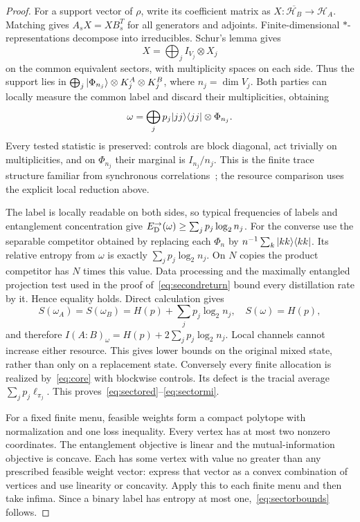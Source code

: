 \begin{proof}
For a support vector of $\rho$, write its coefficient matrix as $X:\overline{\mathcal H_B}\to\mathcal H_A$. Matching gives $A_sX=XB_s^T$ for all generators and adjoints. Finite-dimensional $*$-representations decompose into irreducibles. Schur's lemma gives
\[
 X=\bigoplus_j I_{V_j}\otimes X_j
\]
on the common equivalent sectors, with multiplicity spaces on each side. Thus the support lies in $\bigoplus_j|\Phi_{n_j}\rangle\otimes K_j^A\otimes K_j^B$, where $n_j=\dim V_j$. Both parties can locally measure the common label and discard their multiplicities, obtaining
\begin{equation}
 \omega=\bigoplus_jp_j|jj\rangle\langle jj|\otimes\Phi_{n_j}.\label{eq:core}
\end{equation}
Every tested statistic is preserved: controls are block diagonal, act trivially on multiplicities, and on $\Phi_{n_j}$ their marginal is $I_{n_j}/n_j$. This is the finite trace structure familiar from synchronous correlations~\cite{psstw}; the resource comparison uses the explicit local reduction above.

The label is locally readable on both sides, so typical frequencies of labels and entanglement concentration give $E_{\mathrm D}^{\to}(\omega)\ge\sum_jp_j\log_2n_j$. For the converse use the separable competitor obtained by replacing each $\Phi_n$ by $n^{-1}\sum_k|kk\rangle\langle kk|$. Its relative entropy from $\omega$ is exactly $\sum_jp_j\log_2n_j$. On $N$ copies the product competitor has $N$ times this value. Data processing and the maximally entangled projection test used in the proof of~\eqref{eq:secondreturn} bound every distillation rate by it. Hence equality holds. Direct calculation gives
\[
 S(\omega_A)=S(\omega_B)=H(p)+\sum_jp_j\log_2n_j,\quad S(\omega)=H(p),
\]
and therefore $I(A:B)_\omega=H(p)+2\sum_jp_j\log_2n_j$. Local channels cannot increase either resource. This gives lower bounds on the original mixed state, rather than only on a replacement state. Conversely every finite allocation is realized by~\eqref{eq:core} with blockwise controls. Its defect is the tracial average $\sum_jp_j\ell_{\pi_j}$. This proves~\eqref{eq:sectored}--\eqref{eq:sectormi}.

For a fixed finite menu, feasible weights form a compact polytope with normalization and one loss inequality. Every vertex has at most two nonzero coordinates. The entanglement objective is linear and the mutual-information objective is concave. Each has some vertex with value no greater than any prescribed feasible weight vector: express that vector as a convex combination of vertices and use linearity or concavity. Apply this to each finite menu and then take infima. Since a binary label has entropy at most one,~\eqref{eq:sectorbounds} follows.


\end{proof}
